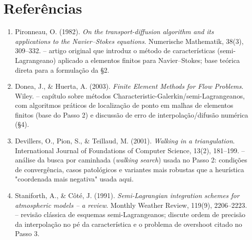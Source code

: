 \documentclass[11pt,a4paper]{article}
\begin{document}
\section{Referências}

\begin{enumerate}
  \item Pironneau, O. (1982). \emph{On the transport-diffusion
    algorithm and its applications to the Navier--Stokes equations}.
    Numerische Mathematik, 38(3), 309--332. -- artigo original que
    introduz o método de características (semi-Lagrangeano) aplicado
    a elementos finitos para Navier--Stokes; base teórica direta para
    a formulação da \S 2.
  \item Donea, J., \& Huerta, A. (2003). \emph{Finite Element Methods
    for Flow Problems}. Wiley. -- capítulo sobre métodos
    Characteristic-Galerkin/semi-Lagrangeanos, com algoritmos práticos
    de localização de ponto em malhas de elementos finitos (base do
    Passo 2) e discussão de erro de interpolação/difusão numérica
    (\S 4).
  \item Devillers, O., Pion, S., \& Teillaud, M. (2001). \emph{Walking
    in a triangulation}. International Journal of Foundations of
    Computer Science, 13(2), 181--199. -- análise da busca por
    caminhada (\emph{walking search}) usada no Passo 2: condições de
    convergência, casos patológicos e variantes mais robustas que a
    heurística "coordenada mais negativa" usada aqui.
  \item Staniforth, A., \& Côté, J. (1991). \emph{Semi-Lagrangian
    integration schemes for atmospheric models -- a review}. Monthly
    Weather Review, 119(9), 2206--2223. -- revisão clássica de
    esquemas semi-Lagrangeanos; discute ordem de precisão da
    interpolação no pé da característica e o problema de overshoot
    citado no Passo 3.
\end{enumerate}
\end{document}
